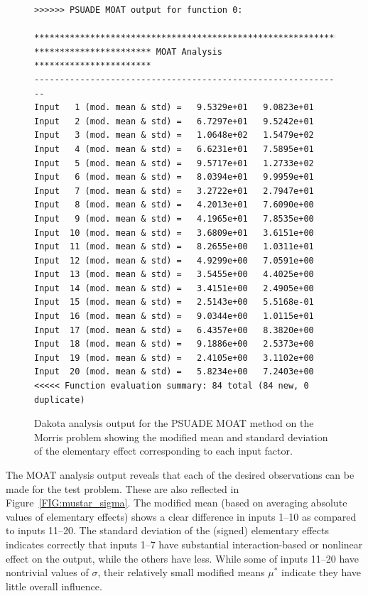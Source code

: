 \begin{figure}[ht!]
\centering
\begin{bigbox}
\begin{small}
\begin{verbatim}
>>>>>> PSUADE MOAT output for function 0:

*************************************************************
*********************** MOAT Analysis ***********************
-------------------------------------------------------------
Input   1 (mod. mean & std) =   9.5329e+01   9.0823e+01
Input   2 (mod. mean & std) =   6.7297e+01   9.5242e+01
Input   3 (mod. mean & std) =   1.0648e+02   1.5479e+02
Input   4 (mod. mean & std) =   6.6231e+01   7.5895e+01
Input   5 (mod. mean & std) =   9.5717e+01   1.2733e+02
Input   6 (mod. mean & std) =   8.0394e+01   9.9959e+01
Input   7 (mod. mean & std) =   3.2722e+01   2.7947e+01
Input   8 (mod. mean & std) =   4.2013e+01   7.6090e+00
Input   9 (mod. mean & std) =   4.1965e+01   7.8535e+00
Input  10 (mod. mean & std) =   3.6809e+01   3.6151e+00
Input  11 (mod. mean & std) =   8.2655e+00   1.0311e+01
Input  12 (mod. mean & std) =   4.9299e+00   7.0591e+00
Input  13 (mod. mean & std) =   3.5455e+00   4.4025e+00
Input  14 (mod. mean & std) =   3.4151e+00   2.4905e+00
Input  15 (mod. mean & std) =   2.5143e+00   5.5168e-01
Input  16 (mod. mean & std) =   9.0344e+00   1.0115e+01
Input  17 (mod. mean & std) =   6.4357e+00   8.3820e+00
Input  18 (mod. mean & std) =   9.1886e+00   2.5373e+00
Input  19 (mod. mean & std) =   2.4105e+00   3.1102e+00
Input  20 (mod. mean & std) =   5.8234e+00   7.2403e+00
<<<<< Function evaluation summary: 84 total (84 new, 0 duplicate)
\end{verbatim}
\end{small}
\end{bigbox}
\caption[Dakota analysis output for PSUADE
MOAT.]{\label{FIG:moat:out_results} Dakota analysis output for the
PSUADE MOAT method on the Morris problem showing the modified
mean and standard deviation of the elementary effect corresponding to
each input factor.}
\end{figure}
The MOAT analysis output reveals that each of the desired observations
can be made for the test problem. These are also reflected in
Figure~\ref{FIG:mustar_sigma}. The modified mean (based on averaging
absolute values of elementary effects) shows a clear difference in
inputs 1--10 as compared to inputs 11--20. The standard deviation of
the (signed) elementary effects indicates correctly that inputs 1--7
have substantial interaction-based or nonlinear effect on the output,
while the others have less. While some of inputs 11--20 have
nontrivial values of $\sigma$, their relatively small modified means
$\mu^*$ indicate they have little overall influence.


